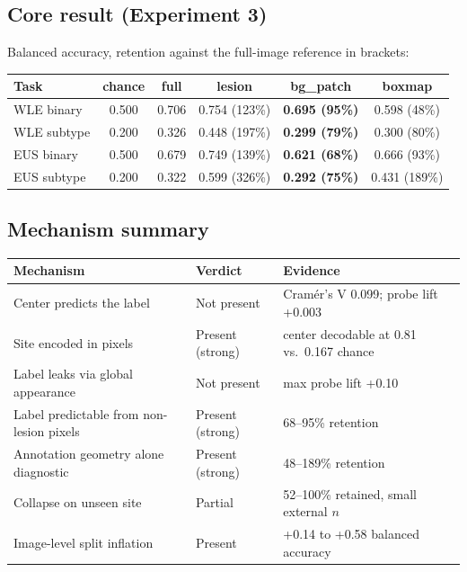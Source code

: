 \documentclass[10pt]{article}
\begin{document}
\subsection{Core result (Experiment 3)}

Balanced accuracy, retention against the full-image reference in brackets:

\begin{center}
\begin{tabular}{lccccc}
\toprule
Task & chance & full & lesion & bg\_patch & boxmap \\
\midrule
WLE binary & 0.500 & 0.706 & 0.754 (123\%) & \textbf{0.695 (95\%)} & 0.598 (48\%) \\
WLE subtype & 0.200 & 0.326 & 0.448 (197\%) & \textbf{0.299 (79\%)} & 0.300 (80\%) \\
EUS binary & 0.500 & 0.679 & 0.749 (139\%) & \textbf{0.621 (68\%)} & 0.666 (93\%) \\
EUS subtype & 0.200 & 0.322 & 0.599 (326\%) & \textbf{0.292 (75\%)} & 0.431 (189\%) \\
\bottomrule
\end{tabular}
\end{center}

\subsection{Mechanism summary}

\begin{center}
\begin{tabular}{L{5.6cm}L{3.4cm}L{4.2cm}}
\toprule
\textbf{Mechanism} & \textbf{Verdict} & \textbf{Evidence} \\
\midrule
Center predicts the label & Not present & Cram\'er's V 0.099; probe lift +0.003 \\
Site encoded in pixels & Present (strong) & center decodable at 0.81 vs.\ 0.167 chance \\
Label leaks via global appearance & Not present & max probe lift +0.10 \\
Label predictable from non-lesion pixels & Present (strong) & 68--95\% retention \\
Annotation geometry alone diagnostic & Present (strong) & 48--189\% retention \\
Collapse on unseen site & Partial & 52--100\% retained, small external $n$ \\
Image-level split inflation & Present & +0.14 to +0.58 balanced accuracy \\
\bottomrule
\end{tabular}
\end{center}
\end{document}
